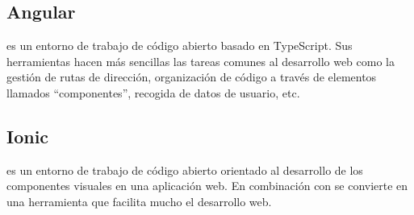 \subsection{Angular}
\citetitle{[33]} es un entorno de trabajo de código abierto basado en TypeScript.
Sus herramientas hacen más sencillas las tareas comunes al desarrollo web como
la gestión de rutas de dirección,
organización de código a través de elementos llamados \enquote{componentes}, 
recogida de datos de usuario, etc.

\subsection{Ionic}
\citetitle{[32]} es un entorno de trabajo de código abierto orientado al desarrollo
de los componentes visuales en una
aplicación web. 
En combinación con \citetitle{[33]} se convierte en una herramienta que facilita 
mucho el desarrollo web. 






